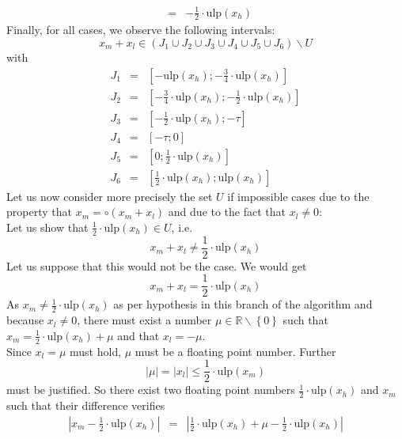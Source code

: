 \documentclass[a4paper,10pt,twoside]{article}
\newenvironment{proof}[1][Proof]{\begin{trivlist}
\item[\hskip \labelsep {\bfseries #1}]}{\end{trivlist}}
\newcommand{\R}{\ensuremath{\mathbb {R}}}
\newcommand{\hi}{\ensuremath{\mathit{h}}}
\newcommand{\mi}{\ensuremath{\mathit{m}}}
\newcommand{\lo}{\ensuremath{\mathit{l}}}
\newcommand{\mUlp}{\ensuremath{\mathrm{ulp}}}
\begin{document}
\begin{proof}
\begin{eqnarray*}
& = & -\frac{1}{2} \cdot  \mUlp\left( x_\hi \right)
\end{eqnarray*}
Finally, for all cases, we observe the following intervals:
$$x_\mi + x_\lo \in \left( J_1 \cup J_2 \cup J_3 \cup J_4 \cup J_5 \cup J_6 \right) \backslash U$$
with
\begin{eqnarray*}
J_1 & = & \left[ - \mUlp\left( x_\hi \right) ; - \frac{3}{4} \cdot \mUlp\left( x_\hi \right) \right] \\
J_2 & = & \left[ - \frac{3}{4} \cdot \mUlp\left( x_\hi \right) ; - \frac{1}{2} \cdot \mUlp\left( x_\hi \right) \right] \\
J_3 & = & \left[ - \frac{1}{2} \cdot \mUlp\left( x_\hi \right) ; - \tau \right] \\
J_4 & = & \left[ - \tau ; 0 \right] \\
J_5 & = & \left[ 0 ; \frac{1}{2} \cdot \mUlp\left( x_\hi \right) \right] \\
J_6 & = & \left[ \frac{1}{2} \cdot \mUlp\left( x_\hi \right) ; \mUlp\left( x_\hi \right) \right]
\end{eqnarray*}
Let us now consider more precisely the set $U$ if impossible cases due to the property that
$x_\mi = \circ \left( x_\mi + x_\lo \right)$ and due to the fact that $x_\lo \not = 0$: \\
Let us show that $\frac{1}{2} \cdot \mUlp\left( x_\hi \right) \in U$, i.e.
$$x_\mi + x_\lo \not = \frac{1}{2} \cdot \mUlp\left( x_\hi \right)$$
Let us suppose that this would not be the case. We would get
$$x_\mi + x_\lo = \frac{1}{2} \cdot \mUlp\left( x_\hi \right)$$
As $x_\mi \not = \frac{1}{2} \cdot \mUlp\left( x_\hi \right)$ as per hypothesis in this branch of the algorithm and because
$x_\lo \not = 0$, there must exist a number $\mu \in \R \backslash \left \lbrace 0 \right \rbrace$ such that
$x_\mi = \frac{1}{2} \cdot \mUlp\left( x_\hi \right) + \mu$ and that $x_\lo = -\mu$. \\
Since $x_\lo = \mu$  must hold, $\mu$ must be a floating point number.
Further $$\left \vert \mu \right \vert = \left \vert x_\lo \right \vert \leq \frac{1}{2} \cdot \mUlp\left( x_\mi \right)$$
must be justified.
So there exist two floating point numbers $\frac{1}{2} \cdot \mUlp\left( x_\hi \right)$ and $x_\mi$ such that
their difference verifies
\begin{eqnarray*}
\left \vert x_\mi - \frac{1}{2} \cdot \mUlp\left( x_\hi \right) \right \vert & = & \left \vert
\frac{1}{2} \cdot \mUlp\left( x_\hi \right) + \mu - \frac{1}{2} \cdot \mUlp\left( x_\hi \right) \right \vert \\

\end{eqnarray*}
\end{proof}
\end{document}
